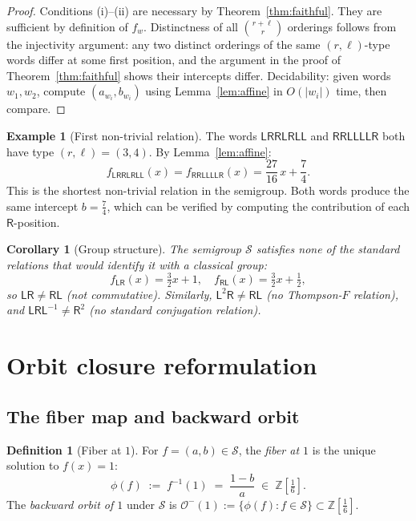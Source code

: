 \documentclass[12pt, a4paper]{amsart}
\theoremstyle{plain}
\newtheorem{corollary}[theorem]{Corollary}
\theoremstyle{definition}
\newtheorem{definition}[theorem]{Definition}
\newtheorem{example}[theorem]{Example}
\theoremstyle{remark}
\newcommand{\Z}{\mathbb{Z}}
\newcommand{\Zs}{\Z[\tfrac{1}{6}]}
\newcommand{\wL}{\mathsf{L}}
\newcommand{\wR}{\mathsf{R}}
\begin{document}
\begin{proof}
  Conditions (i)--(ii) are necessary by Theorem~\ref{thm:faithful}.
  They are sufficient by definition of $f_w$.  Distinctness of all
  $\binom{r+\ell}{r}$ orderings follows from the injectivity argument:
  any two distinct orderings of the same $(r,\ell)$-type words differ
  at some first position, and the argument in the proof of
  Theorem~\ref{thm:faithful} shows their intercepts differ.
  Decidability: given words $w_1, w_2$, compute $(a_{w_i},b_{w_i})$
  using Lemma~\ref{lem:affine} in $O(|w_i|)$ time, then compare.
\end{proof}

\begin{example}[First non-trivial relation]
  The words $\mathsf{LRRLRLL}$ and $\mathsf{RRLLLLR}$ both have type
  $(r,\ell)=(3,4)$.  By Lemma~\ref{lem:affine}:
  \[
    f_{\mathsf{LRRLRLL}}(x) = f_{\mathsf{RRLLLLR}}(x)
    = \frac{27}{16}\,x + \frac{7}{4}.
  \]
  This is the shortest non-trivial relation in the semigroup.
  Both words produce the same intercept $b=\frac{7}{4}$, which can be
  verified by computing the contribution of each $\wR$-position.
\end{example}

\begin{corollary}[Group structure]
  \label{cor:structure}
  The semigroup $\mathcal{S}$ satisfies none of the standard relations
  that would identify it with a classical group:
  \[
    f_{\wL\wR}(x) = \tfrac{3}{2}x+1, \quad
    f_{\wR\wL}(x) = \tfrac{3}{2}x+\tfrac{1}{2},
  \]
  so $\wL\wR\neq\wR\wL$ (not commutative).  Similarly,
  $\wL^2\wR\neq\wR\wL$ (no Thompson-$F$ relation), and
  $\wL\wR\wL^{-1}\neq\wR^2$ (no standard conjugation relation).
\end{corollary}

\section{Orbit closure reformulation}
\label{sec:orbit}

\subsection{The fiber map and backward orbit}

\begin{definition}[Fiber at $1$]
  For $f=(a,b)\in\mathcal{S}$, the \emph{fiber at $1$} is the unique
  solution to $f(x)=1$:
  \[
    \phi(f) \;:=\; f^{-1}(1) \;=\; \frac{1-b}{a} \;\in\;\Zs.
  \]
  The \emph{backward orbit of $1$} under $\mathcal{S}$ is
  $\mathcal{O}^-(1) := \{\phi(f) : f\in\mathcal{S}\} \subset \Zs$.
\end{definition}
\end{document}
